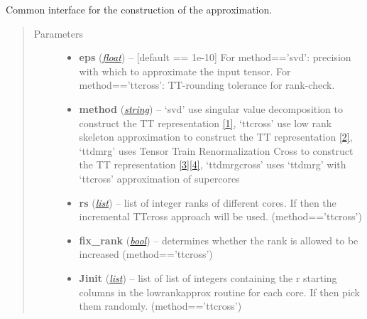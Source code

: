 \documentclass[a4paper,10pt,english]{sphinxmanual}
\begin{document}
\begin{fulllineitems}
\begin{fulllineitems}
\label{api-qttmat:TensorToolbox.core.QTTmat.build}
Common interface for the construction of the approximation.
\begin{quote}\begin{description}
\item[{Parameters}] \leavevmode\begin{itemize}
\item {} 
\textbf{eps} (\href{http://docs.python.org/library/functions.html\#float}{\emph{float}}) -- {[}default == 1e-10{]} For method=='svd': precision with which to approximate the input tensor. For method=='ttcross': TT-rounding tolerance for rank-check.

\item {} 
\textbf{method} (\href{http://docs.python.org/library/string.html\#module-string}{\emph{string}}) -- `svd' use singular value decomposition to construct the TT representation {\hyperref[zrefs:oseledets2011]{{[}1{]}}}, `ttcross' use low rank skeleton approximation to construct the TT representation {\hyperref[zrefs:oseledets2010]{{[}2{]}}}, `ttdmrg' uses Tensor Train Renormalization Cross to construct the TT representation {\hyperref[zrefs:savostyanov2011]{{[}3{]}}}{\hyperref[zrefs:savostyanov2013]{{[}4{]}}}, `ttdmrgcross' uses `ttdmrg' with `ttcross' approximation of supercores

\item {} 
\textbf{rs} (\href{http://docs.python.org/library/functions.html\#list}{\emph{list}}) -- list of integer ranks of different cores. If  then the incremental TTcross approach will be used. (method=='ttcross')

\item {} 
\textbf{fix\_rank} (\href{http://docs.python.org/library/functions.html\#bool}{\emph{bool}}) -- determines whether the rank is allowed to be increased (method=='ttcross')

\item {} 
\textbf{Jinit} (\href{http://docs.python.org/library/functions.html\#list}{\emph{list}}) -- list of list of integers containing the r starting columns in the lowrankapprox routine for each core. If  then pick them randomly. (method=='ttcross')


\end{itemize}
\end{description}
\end{quote}
\end{fulllineitems}
\end{fulllineitems}
\end{document}

